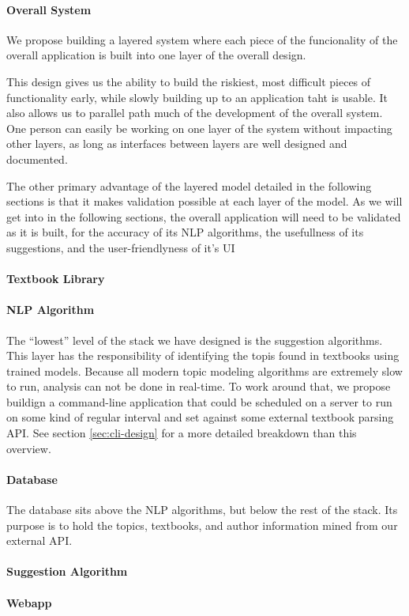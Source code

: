 \paragraph{Overall System}
We propose building a layered system where each piece of the
funcionality of the overall application is built into one layer of the
overall design.

This design gives us the ability to build the riskiest, most difficult
pieces of functionality early, while slowly building up to an
application taht is usable.
It also allows us to parallel path much of the development of the
overall system.
One person can easily be working on one layer of the system without
impacting other layers, as long as interfaces between layers are well
designed and documented.

The other primary advantage of the layered model detailed in the
following sections is that it makes validation possible at each layer
of the model.
As we will get into in the following sections, the overall application
will need to be validated as it is built, for the accuracy of its NLP
algorithms, the usefullness of its suggestions, and the
user-friendlyness of it's UI


\paragraph{Textbook Library}

\paragraph{NLP Algorithm}
The ``lowest'' level of the stack we have designed is the suggestion
algorithms.
This layer has the responsibility of identifying the topis found in
textbooks using trained models.
Because all modern topic modeling algorithms are extremely slow to
run, analysis can not be done in real-time.
To work around that, we propose buildign a command-line application
that could be scheduled on a server to run on some kind of regular
interval and set against some external textbook parsing API.  
See section \ref{sec:cli-design} for a more detailed breakdown than
this overview.

\paragraph{Database}
The database sits above the NLP algorithms, but below the rest of the
stack.
Its purpose is to hold the topics, textbooks, and author information
mined from our external API.  


\paragraph{Suggestion Algorithm}

\paragraph{Webapp}

